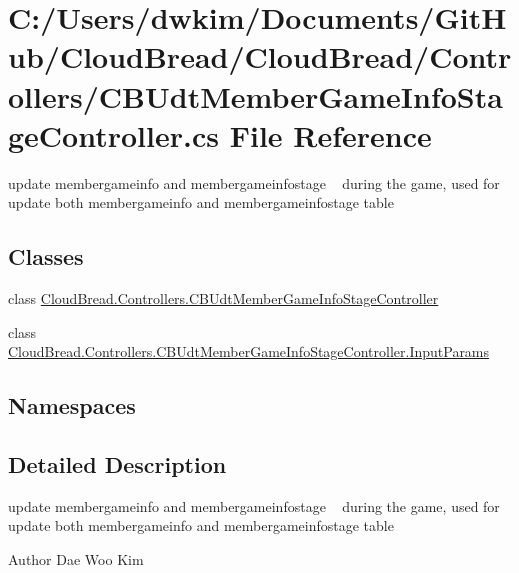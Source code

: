 \hypertarget{a00230}{}\section{C\+:/\+Users/dwkim/\+Documents/\+Git\+Hub/\+Cloud\+Bread/\+Cloud\+Bread/\+Controllers/\+C\+B\+Udt\+Member\+Game\+Info\+Stage\+Controller.cs File Reference}
\label{a00230}


update membergameinfo and membergameinfostage ~\newline
during the game, used for update both membergameinfo and membergameinfostage table ~\newline
 


\subsection*{Classes}
\begin{DoxyCompactItemize}
\item 
class \hyperlink{a00059}{Cloud\+Bread.\+Controllers.\+C\+B\+Udt\+Member\+Game\+Info\+Stage\+Controller}
\item 
class \hyperlink{a00111}{Cloud\+Bread.\+Controllers.\+C\+B\+Udt\+Member\+Game\+Info\+Stage\+Controller.\+Input\+Params}
\end{DoxyCompactItemize}
\subsection*{Namespaces}
\begin{DoxyCompactItemize}
\end{DoxyCompactItemize}


\subsection{Detailed Description}
update membergameinfo and membergameinfostage ~\newline
during the game, used for update both membergameinfo and membergameinfostage table ~\newline


\begin{DoxyAuthor}{Author}
Dae Woo Kim 
\end{DoxyAuthor}

